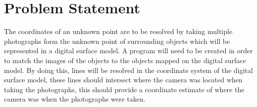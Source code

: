 \section{Problem Statement}
The coordinates of an unknown point are to be resolved by taking multiple photographs form the unknown point of surrounding objects which will be represented in a digital surface model. A program will need to be created in order to match the images of the objects to the objects mapped on the digital surface model. By doing this, lines will be resolved in the coordinate system of the digital surface model, these lines should intersect where the camera was located when taking the photographs, this should provide a coordinate estimate of where the camera was when the photographs were taken.